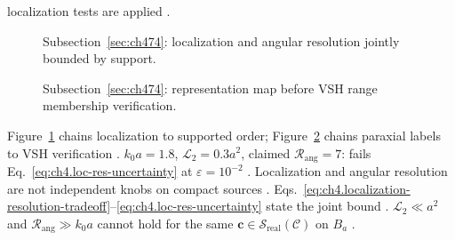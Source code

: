 localization tests are applied \cite{stratton1941}.
\begin{figure}[t]
\centering
{}
\caption{Subsection~\ref{sec:ch474}: localization and angular resolution jointly bounded by support.}
\label{fig:ch4.loc-resolution-tradeoff}
\end{figure}
\begin{figure}[t]
\centering
{}
\caption{Subsection~\ref{sec:ch474}: representation map before VSH range membership verification.}
\label{fig:ch4.lg-vsh-relation}
\end{figure}
Figure~\ref{fig:ch4.loc-resolution-tradeoff} chains localization to supported order; Figure~\ref{fig:ch4.lg-vsh-relation} chains paraxial labels to
VSH verification \cite{harrington2001}.
\(k_{0}a=1.8\), \(\mathcal{L}_{2}=0.3a^{2}\), claimed \(\mathcal{R}_{\mathrm{ang}}=7\): fails Eq.~\eqref{eq:ch4.loc-res-uncertainty} at \(\varepsilon=10^{-2}\)
\cite{hansen1988}.
Localization and angular resolution are not independent knobs on compact sources \cite{hansen1988}. Eqs.~\eqref{eq:ch4.localization-resolution-tradeoff}--\eqref{eq:ch4.loc-res-uncertainty} state the joint bound \cite{devaney2004}.
\label{cor:ch4.no-free-superres}
\(\mathcal{L}_{2}\ll a^{2}\) and \(\mathcal{R}_{\mathrm{ang}}\gg k_{0}a\) cannot hold for the same \(\mathbf{c}\in\mathcal{S}_{\mathrm{real}}(\mathcal{C})\) on \(B_{a}\)
\cite{stratton1941}.
